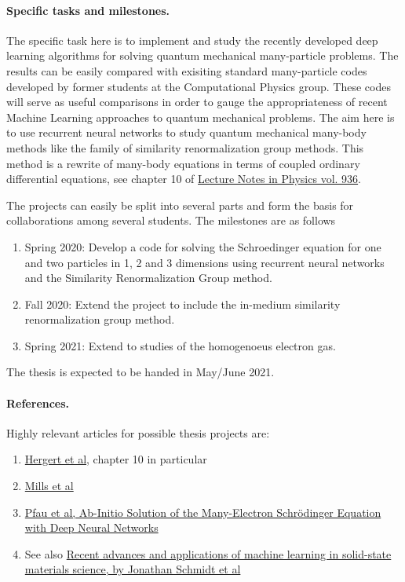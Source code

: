 \documentclass[%
oneside,                 %
final,                   %
10pt]{article}
\begin{document}
\paragraph{Specific tasks and milestones.}
The specific task here is to implement and study the recently developed
deep learning algorithms for solving quantum mechanical many-particle
problems. The results can  be easily compared with exisiting standard
many-particle codes developed by former students at the Computational
Physics group. These codes will serve as useful comparisons in order
to gauge the appropriateness of recent Machine Learning approaches to
quantum mechanical problems.   The aim here is to use recurrent neural networks to study quantum mechanical many-body methods like the family of similarity renormalization group methods.
This method is a rewrite of many-body equations in terms of coupled ordinary differential equations, see chapter 10 of \href{{https://www.springer.com/gp/book/9783319533353}}{Lecture Notes in Physics vol. 936}. 



The projects can easily be split into several parts and form the basis for collaborations among several students. The milestones are as follows
\begin{enumerate}
\item Spring 2020: Develop a code for solving the Schroedinger equation for one and two particles in 1, 2 and 3 dimensions using recurrent neural networks and the Similarity Renormalization Group method. 

\item Fall 2020: Extend the project to include the in-medium similarity renormalization group method.

\item Spring 2021: Extend to studies of the homogenoeus electron gas.
\end{enumerate}

\noindent
The thesis is expected to be handed in May/June  2021.

\paragraph{References.}
Highly relevant articles for possible thesis projects are:

\begin{enumerate}
\item \href{{https://www.springer.com/gp/book/9783319533353}}{Hergert et al}, chapter 10 in particular

\item \href{{https://journals.aps.org/pra/abstract/10.1103/PhysRevA.96.042113}}{Mills et al} 

\item \href{{https://arxiv.org/abs/1909.02487}}{Pfau et al, Ab-Initio Solution of the Many-Electron Schrödinger Equation with Deep Neural Networks}

\item See also \href{{https://www.nature.com/articles/s41524-019-0221-0}}{Recent advances and applications of machine learning in solid-state materials science, by  Jonathan Schmidt et al}
\end{enumerate}

\noindent

\end{document}
